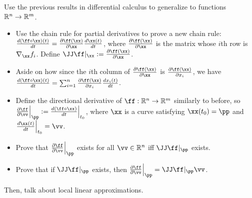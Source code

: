 Use the previous results in differential calculus to generalize to functions $\mathbb{R}^n \rightarrow \mathbb{R}^m$.

\begin{itemize}
    \item Use the chain rule for partial derivatives to prove a new chain rule: $\frac{d (\ff \circ \xx)(t)}{dt} = \frac{\pd \ff(\xx)}{\pd \xx} \frac{d\xx(t)}{dt}$, where $\frac{\pd \ff(\xx)}{\pd \xx}$ is the matrix whose $i$th row is $\nabla_\xx f_i$. Define $\JJ \ff|_\xx := \frac{\pd \ff(\xx)}{\pd \xx}$.
    \item Aside on how since the $i$th column of $\frac{\pd \ff(\xx)}{\pd \xx}$ is $\frac{\pd \ff(\xx)}{\pd x_i}$, we have $\frac{d (\ff \circ \xx)(t)}{dt} = \sum_{i = 1}^{n} \frac{\pd \ff(\xx)}{\pd x_i} \frac{d x_i(t)}{dt}$.
    \item Define the directional derivative of $\ff:\R^n \rightarrow \R^m$ similarly to before, so $\frac{\pd \ff}{\pd \vv} \Big|_\pp := \frac{d (\ff \circ \xx)}{dt}\Big|_{t_0}$, where $\xx$ is a curve satisfying $\xx(t_0) = \pp$ and $\frac{d\xx(t)}{dt}\Big|_{t_0} = \vv$.
    \item Prove that $\frac{\pd \ff}{\pd \vv}\Big|_\pp$ exists for all $\vv \in \R^n$ iff $\JJ \ff|_\pp$ exists.
    \item Prove that if $\JJ \ff|_\pp$ exists, then $\frac{\pd \ff}{\pd \vv}\Big|_\pp = \JJ \ff|_\pp \vv$.
\end{itemize}

Then, talk about local linear approximations. 

